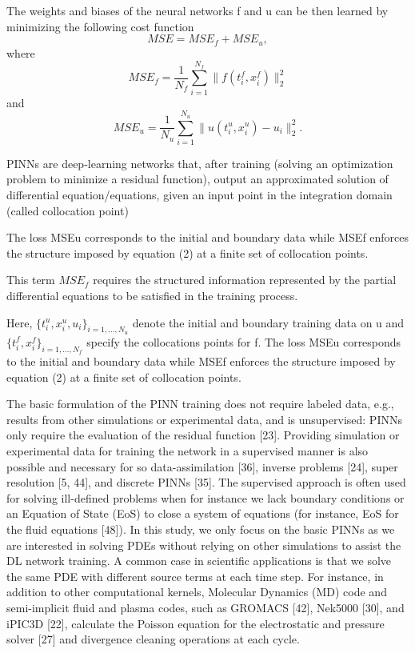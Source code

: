 The weights and biases of the neural networks f and u can be then learned by minimizing the following cost function
\begin{equation*}
    MSE = MSE_f + MSE_u, 
\end{equation*}
where
\begin{equation*}
    MSE_f = \frac{1}{N_f} \sum^{N_f}_{i = 1} \lVert f(t^{f}_i, x^{f}_i) \rVert^{2}_{2}
\end{equation*}
and
\begin{equation*}
    MSE_u = \frac{1}{N_u} \sum^{N_u}_{i = 1} \lVert u(t^{u}_i, x^{u}_i) - u_i \rVert^{2}_{2}.
\end{equation*}


PINNs are deep-learning networks that, after training (solving an optimization problem to minimize a residual function), output an approximated solution of differential equation/equations, given an input point in the integration domain (called collocation point)

The loss MSEu corresponds to the initial and boundary data while MSEf enforces the structure imposed by equation (2) at a finite set of collocation points.

This term $MSE_f$ requires the structured information represented by the partial differential equations to be satisfied in the training process.

Here, $\{t^{u}_i, x^{u}_i, u_i \}_{i = 1, \ldots, N_u}$ denote the initial and boundary training data on u and  $\{t^{f}_i, x^{f}_i \}_{i = 1, \ldots, N_f}$ specify the collocations points for f. The loss MSEu corresponds to the initial and boundary data while MSEf enforces the structure imposed by equation (2) at a finite set of collocation points. 



The basic formulation of the PINN training does not require labeled data, e.g., results from other simulations or experimental data, and is unsupervised: PINNs only require the evaluation of the residual function [23]. Providing simulation or experimental data for training the network in a supervised manner is also possible and necessary for so data-assimilation [36], inverse problems [24], super resolution [5, 44], and discrete PINNs [35]. The supervised approach is often used for solving ill-defined problems when for instance we lack boundary conditions or an Equation of State (EoS) to close a system of equations (for instance, EoS for the fluid equations [48]). In this study, we only focus on the basic PINNs as we are interested in solving PDEs without relying on other simulations to assist the DL network training. A common case in scientific applications is that we solve the same PDE with different source terms at each time step. For instance, in addition to other computational kernels, Molecular Dynamics (MD) code and semi-implicit fluid and plasma codes, such as GROMACS [42], Nek5000 [30], and iPIC3D [22], calculate the Poisson equation for the electrostatic and pressure solver [27] and divergence cleaning operations at each cycle.

